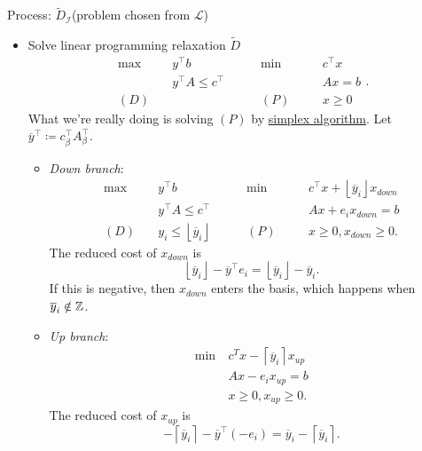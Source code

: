 Process: \(\widetilde{D}_{\mathcal{I}}\)(problem chosen from \(\mathcal{L}\))
\begin{itemize}
	\item Solve linear programming relaxation \(\widetilde{D}\)
	      \[
		      \begin{alignedat}{5}
			      \max ~&y^{\top}b\qquad\qquad	&&\min~		&&c^{\top}x\\
			      &y^{\top}A\leq c^{\top} 		&&			&&Ax = b\\
			      (D)\quad	& 				&&(P)\quad	&&x\geq  0
		      \end{alignedat}.
	      \]
	      What we're really doing is solving \((P)\) by \hyperref[algo:simplex-algorithm]{simplex algorithm}. Let \(\overline{y}^{\top}\coloneqq c^{\top}_{\beta}A^{\top}_{\beta}\).
	      \begin{itemize}
		      \item \emph{Down branch}:
		            \[
			            \begin{alignedat}{5}
				            \max ~	&y^{\top}b\qquad\qquad				&&\min~	&&c^{\top}x+\left\lfloor \overline{y}_{i} \right\rfloor x_{down}\\
				            &y^{\top}A\leq c^{\top} 				&&		&&Ax + e_{i}x_{down} = b\\
				            (D)\quad& y_{i}\leq \left\lfloor \overline{y}_{i} \right\rfloor	&&(P)\quad&&x\geq 0, x_{down}\geq 0.
			            \end{alignedat}
		            \]
		            The reduced cost of \(x_{down}\) is
		            \[
			            \left\lfloor \overline{y}_{i} \right\rfloor - \overline{y}^{\top}e_{i} = \left\lfloor \overline{y}_{i} \right\rfloor - \overline{y}_{i}.
		            \]
		            If this is negative, then \(x_{down}\) enters the basis, which happens when \(\overline{y}_{i}\notin\mathbb{\MakeUppercase{Z}}\).
		      \item \emph{Up branch}:
		            \begin{align*}
			            \min~ & c^Tx  - \left\lceil \overline{y}_{i} \right\rceil x_{up} \\
			                  & Ax - e_{i}x_{up}= b                                      \\
			                  & x\geq 0, x_{up}\geq 0.
		            \end{align*}
		            The reduced cost of \(x_{up}\) is
		            \[
			            -\left\lceil \overline{y}_{i} \right\rceil - \overline{y}^{\top}(-e_{i}) = \overline{y}_{i} - \left\lceil \overline{y}_{i} \right\rceil.
\]
\end{itemize}
\end{itemize}
